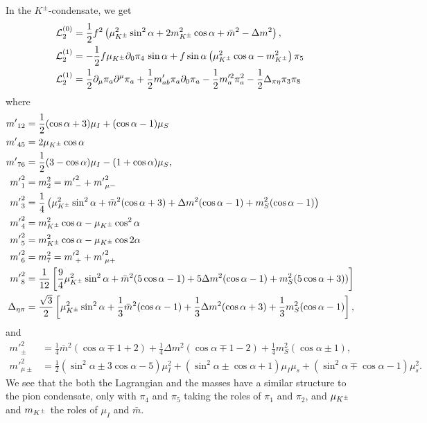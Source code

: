 In the $K^\pm$-condensate, we get
%
\begin{align}
    \label{static three-flavor lagrangian kaon condensate}
    \mathcal{L}^{(0)}_2 
    & =
    \frac{1}{2}f^2 
    \left(
        \mu_{K^\pm}^2 \sin^2\alpha
        + 2m^2_{K^\pm} \cos\alpha
        + \bar m^2 - \Delta m^2
    \right), \\
    \label{linear three-flavor lagrangian kaon condensate}
    \mathcal{L}_2^{(1)}
    & 
    =
    - \frac{1}{2}f\mu_{K^\pm}\partial_0\pi_4 \, \sin\alpha 
    + f\sin\alpha
    \left(
        \mu_{K^\pm}^2 \cos\alpha
        -m_{K^\pm}^2
    \right)\pi_5\\
    \label{quadratic three-flavor lagrangian kaon condensate}
    \mathcal{L}_2^{(1)}
    & =
    \frac{1}{2} \partial_\mu \pi_a \partial^\mu \pi_a
    + \frac{1}{2}m'_{ab} \pi_a\partial_0\pi_a
    - \frac{1}{2}m'^2_{a} \pi_a^2
    - \frac{1}{2}\Delta_{\pi\eta} \pi_3\pi_8
\end{align}
%
where
%
\begingroup
\allowdisplaybreaks
\begin{align}
    {m'}_{12} &= \frac{1}{2}(\cos\alpha + 3)\mu_I + (\cos\alpha - 1)\mu_S \\
    {m'}_{45} &= 2\mu_{K^\pm}\cos\alpha \\
    {m'}_{76} &= \frac{1}{2}(3-\cos\alpha) \mu_I - (1 + \cos\alpha)\mu_S, \\
    {m'}_1^2 & = m_2^2 = {m'}_-^2 + {m'}_{\mu-}^2\\
    {m'}_3^2 
    & = 
    \frac{1}{4}
    \left(
        \mu_{K^\pm}^2 \sin^2\alpha
        + \bar m^2(\cos\alpha + 3)
        + \Delta m^2 (\cos\alpha -1)
        + m_S^2(\cos\alpha - 1)
    \right)\\
    {m'}_4^2 & = m_{K^\pm}^2\cos\alpha -\mu_{K^\pm} \cos^2\alpha \\
    {m'}_5^2 & = m_{K^\pm}^2\cos\alpha -\mu_{K^\pm} \cos 2\alpha \\
    {m'}_6^2 & = m_7^2 = {m'}_+^2 + {m'}_{\mu+}^2\\
    {m'}_8^2
    & =
    \frac{1}{12}
    \left[
        \frac{9}{4}\mu_{K^\pm}^2\sin^2\alpha
        + \bar m^2(5\cos\alpha-1) 
        + 5\Delta m^2(\cos\alpha-1)
        + m_S^2(5\cos\alpha+3))
    \right] \\
    \Delta_{\eta\pi}
    & =
    \frac{\sqrt{3}}{2}
    \left[
        \mu_{K^\pm}^2\sin^2\alpha
        + \frac{1}{3}\bar m^2(\cos\alpha - 1)
        + \frac{1}{3}\Delta m^2(\cos\alpha + 3)
        + \frac{1}{3}m^2_S(\cos\alpha - 1)
    \right],
\end{align}
\endgroup
%
and
%
\begingroup
\allowdisplaybreaks
\begin{align}
    {m'}_\pm^2
    & =
    \frac{1}{4}\bar m^2 (\cos\alpha \mp 1 + 2)
    + \frac{1}{4} \Delta m^2 (\cos\alpha \mp 1-2)
    +\frac{1}{4} m_S^2 (\cos\alpha \pm 1), \\
    {m'}_{\mu\pm}^2
    & =
    \frac{1}{2}(\sin^2\alpha  \pm 3\cos\alpha - 5)\mu_I^2
    +(\sin^2\alpha\pm\cos\alpha + 1)\mu_I\mu_s
    +(\sin^2\alpha\mp\cos\alpha - 1)\mu_s^2.
\end{align}
\endgroup
%
We see that the both the Lagrangian and the masses have a similar structure to the pion condensate, only with $\pi_4$ and $\pi_5$ taking the roles of $\pi_1$ and $\pi_2$, and $\mu_{K^\pm}$ and $m_{K^\pm}$ the roles of $\mu_I$ and $\bar m$.


